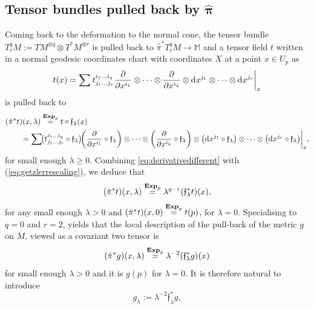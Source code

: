 \documentclass[10pt,a4paper]{amsart}
\numberwithin{equation}{section}
\theoremstyle{definition}
\newcommand{\M}{\mathbb M}
\begin{document}
\subsection[Tensor bundles pulled back by hat pi]{Tensor bundles pulled back by $\boldsymbol{\hat\pi}$} %
 Coming back to the deformation to the normal cone, the tensor bundle $T_r^qM:=TM^{\otimes q}\otimes T^*M^{\otimes r}$ is pulled back to $\hat \pi^* T^q_rM \longrightarrow \M$ and a tensor field $t$ written in a normal geodesic coordinates chart with coordinates $X$ at a point $x\in U_p$ as
\begin{equation}\label{eq:tensor}
t(x)=\sum t_{j_1\dots j_r}^{i_1 \dots i_q}\frac{\partial}{\partial x^{i_1}} \otimes\dots\otimes \frac{\partial}{\partial x^{i_q}} \otimes {\rm d}x^{j_1}\otimes\dots\otimes {\rm d}x^{j_r}\bigg|_x
\end{equation}
is pulled back to
\begin{align*}%
&(\hat \pi^* t)(x,\lambda) \overset{\text{\bf Exp}_p}{=} t\circ \mathfrak{f}_\lambda(x)\nonumber\\
&\qquad{}=\sum\! \bigl(t_{j_1\dots j_r}^{i_1 \dots i_q}\circ \mathfrak{f}_\lambda\bigr)\! \biggl(\frac{\partial}{\partial x^{i_1}}\circ \mathfrak{f}_\lambda\biggr) \otimes\dots\otimes \biggl(\frac{\partial}{\partial x^{i_q}}\circ \mathfrak{f}_\lambda\biggr) \otimes \bigl({\rm d}x^{j_1}\circ \mathfrak{f}_\lambda\bigr) \otimes\dots\otimes \bigl({\rm d}x^{j_r}\circ \mathfrak{f}_\lambda\bigr)\biggl|_x,
\end{align*}
for small enough $\lambda\geq 0$. Combining \eqref{eq:derivativedifferent} with (\ref{eq:getzlerrescaling}), we deduce that
\begin{equation*}
(\hat \pi^* t)(x,\lambda)\overset{\text{\bf Exp}_p}{=}\lambda^{q-r}(\mathfrak{f}_\lambda^*t)(x),
\end{equation*}
for any small enough $\lambda>0$ and $(\hat \pi^* t)(x,0)\overset{\text{\bf Exp}_p}{=}t(p)$, for $\lambda=0$. Specialising to $q=0$ and $r=2$, yields that the local description of the pull-back of the metric $g$ on $M$, viewed as a covariant two tensor is
\begin{equation}\label{eq:pistarg}
(\hat \pi^* g)(x,\lambda)\overset{\text{\bf Exp}_p}{=}\lambda^{-2} ({\mathfrak f}_\lambda^*g)(x)
\end{equation}
for small enough $\lambda>0$ and it is $g(p)$ for $\lambda=0$. It is therefore natural to introduce \begin{equation}\label{eq:glambda}g_\lambda:=\lambda^{-2} \mathfrak{f}_\lambda^* g,
\end{equation}
\end{document}
